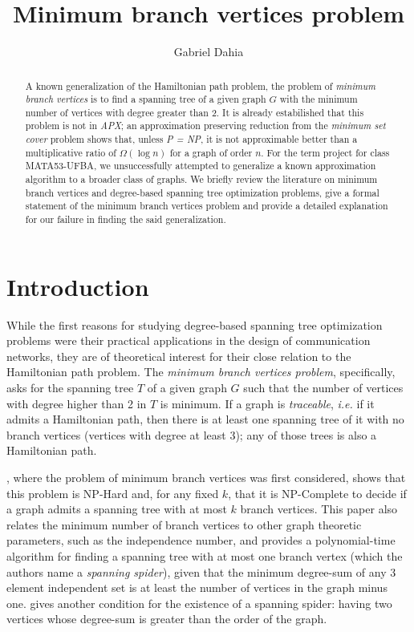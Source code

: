 \documentclass[12pt]{article}
\title{Minimum branch vertices problem}
\author{Gabriel Dahia\inst{1}}
\begin{document}
 

\maketitle

\begin{abstract}
  A known generalization of the Hamiltonian path problem, the problem of \emph{minimum branch vertices} is to find a spanning tree of a given graph $G$ with the minimum number of vertices with degree greater than 2.
  It is already estabilished that this problem is not in \emph{APX}; an approximation preserving reduction from the \emph{minimum set cover} problem shows that, unless \emph{P = NP}, it is not approximable better than a multiplicative ratio of $\Omega(\log n )$ for a graph of order $n$.
  For the term project for class MATA53-UFBA, we unsuccessfully attempted to generalize a known approximation algorithm to a broader class of graphs.
  We briefly review the literature on minimum branch vertices and degree-based spanning tree optimization problems, give a formal statement of the minimum branch vertices problem and provide a detailed explanation for our failure in finding the said generalization.
\end{abstract}
     
\section{Introduction}

While the first reasons for studying degree-based spanning tree optimization problems were their practical applications in the design of communication networks, they are of theoretical interest for their close relation to the Hamiltonian path problem.
The \emph{minimum branch vertices problem}, specifically, asks for the spanning tree $T$ of a given graph $G$ such that the number of vertices with degree higher than 2 in $T$ is minimum.
If a graph is \emph{traceable}, \emph{i.e.} if it admits a Hamiltonian path, then there is at least one spanning tree of it with no branch vertices (vertices with degree at least 3); any of those trees is also a Hamiltonian path.

\cite{gargano2004}, where the problem of minimum branch vertices was first considered, shows that this problem is NP-Hard and, for any fixed $k$, that it is NP-Complete to decide if a graph admits a spanning tree with at most $k$ branch vertices. 
This paper also relates the minimum number of branch vertices to other graph theoretic parameters, such as the independence number, and provides a polynomial-time algorithm for finding a spanning tree with at most one branch vertex (which the authors name a \emph{spanning spider}), given that the minimum degree-sum of any 3 element independent set is at least the number of vertices in the graph minus one.
\cite{flandrin2008} gives another condition for the existence of a spanning spider: having two vertices whose degree-sum is greater than the order of the graph.
\end{document}
